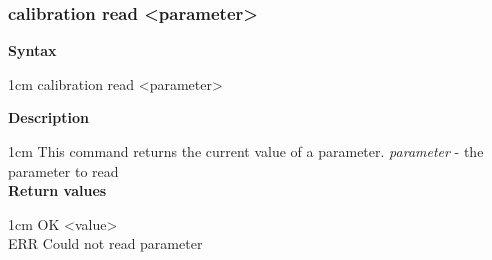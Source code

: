 \documentclass{article}[a4paper]
\begin{document}
\subsubsection{calibration read <parameter>}
\begin{tcolorbox}
	{\bf Syntax}

	 1cm \dimexpr\linewidth-2cm\relax
	calibration read <parameter>

	\medskip
	{\bf Description}

	 1cm \dimexpr\linewidth-2cm\relax
	This command returns the current value of a parameter.
	\medskip
	{\it parameter} - the parameter to read \\

	\medskip
	{\bf Return values}

	 1cm \dimexpr\linewidth-2cm\relax
	OK <value> \\
	ERR Could not read parameter
\end{tcolorbox}
\end{document}
